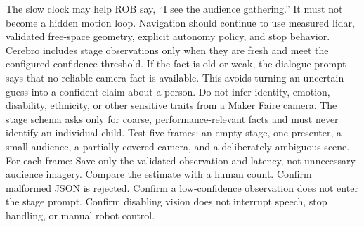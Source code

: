 {}The slow clock may help ROB say, “I see the audience gathering.” It must not\markdownRendererSoftLineBreak
{}become a hidden motion loop. Navigation should continue to use measured lidar,\markdownRendererSoftLineBreak
{}validated free-space geometry, explicit autonomy policy, and stop behavior.\markdownRendererInterblockSeparator
{}
\markdownRendererSectionEnd \markdownRendererSectionBegin
{}\markdownRendererInterblockSeparator
{}Cerebro includes stage observations only when they are fresh and meet the\markdownRendererSoftLineBreak
{}configured confidence threshold. If the fact is old or weak, the dialogue\markdownRendererSoftLineBreak
{}prompt says that no reliable camera fact is available. This avoids turning an\markdownRendererSoftLineBreak
{}uncertain guess into a confident claim about a person.\markdownRendererParagraphSeparator
{}Do not infer identity, emotion, disability, ethnicity, or other sensitive\markdownRendererSoftLineBreak
{}traits from a Maker Faire camera. The stage schema asks only for coarse,\markdownRendererSoftLineBreak
{}performance-relevant facts and must never identify an individual child.\markdownRendererInterblockSeparator
{}
\markdownRendererSectionEnd \markdownRendererSectionBegin
{}\markdownRendererInterblockSeparator
{}Test five frames: an empty stage, one presenter, a small audience, a partially\markdownRendererSoftLineBreak
{}covered camera, and a deliberately ambiguous scene. For each frame:\markdownRendererInterblockSeparator
{}\markdownRendererOlBegin
{}Save only the validated observation and latency, not unnecessary audience\markdownRendererSoftLineBreak
{}imagery.\markdownRendererOlItemEnd 
{}Compare the estimate with a human count.\markdownRendererOlItemEnd 
{}Confirm malformed JSON is rejected.\markdownRendererOlItemEnd 
{}Confirm a low-confidence observation does not enter the stage prompt.\markdownRendererOlItemEnd 
{}Confirm disabling vision does not interrupt speech, stop handling, or\markdownRendererSoftLineBreak
{}manual robot control.\markdownRendererOlItemEnd 
\markdownRendererOlEnd \markdownRendererInterblockSeparator
{}\markdownRendererThematicBreak{}\markdownRendererInterblockSeparator
{}
\markdownRendererSectionEnd 
\markdownRendererSectionEnd \markdownRendererSectionBegin
{}\markdownRendererInterblockSeparator
